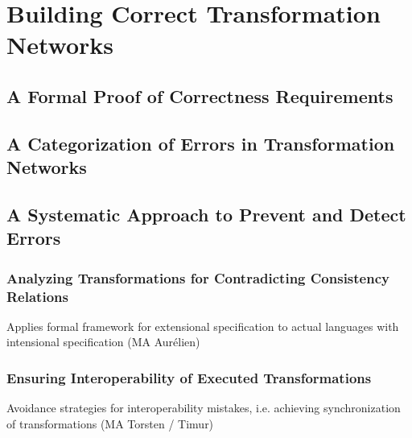 \part{Building Correct Transformation Networks }


\chapter{A Formal Proof of Correctness Requirements
}

\chapter{A Categorization of Errors in Transformation Networks
}

\chapter{A Systematic Approach to Prevent and Detect Errors
}

\section{Analyzing Transformations for Contradicting Consistency Relations }
Applies formal framework for extensional specification to actual languages with intensional specification (MA Aurélien)

\section{Ensuring Interoperability of Executed Transformations }
Avoidance strategies for interoperability mistakes, i.e. achieving synchronization of transformations (MA Torsten / Timur)

